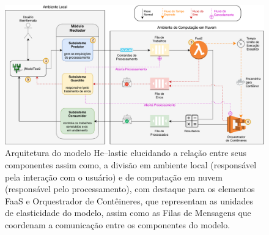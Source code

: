 \documentclass[english,brazilian]{UNISINOSmonografia} %
\begin{document}
\begin{figure}[tb]
\centering%
\begin{minipage}{\textwidth}
	\caption[Arquitetura do modelo \textsf{He}--lastic elucidando a relação entre seus componentes, assim como, a divisão em ambiente local e de computação em nuvem]{Arquitetura do modelo \textsf{He}--lastic elucidando a relação entre seus componentes assim como, a divisão em ambiente local (responsável pela interação com o usuário) e de computação em nuvem (responsável pelo processamento), com destaque para os elementos FaaS e Orquestrador de Contêineres, que representam as unidades de elasticidade do modelo, assim como as Filas de Mensagens que coordenam a comunicação entre os componentes do modelo.}
	\label{fig:modelo-arq-full}
	\vspace{1ex}
	\includegraphics[width=\textwidth]{modelo-full}
	
	
\end{minipage}
\end{figure}
\end{document}
